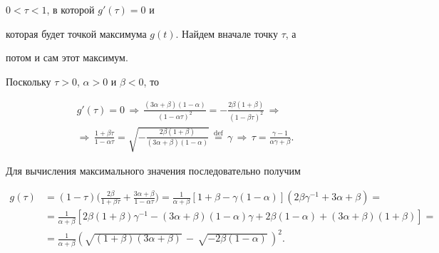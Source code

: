 $0<\tau<1$, в которой $g'(\tau)=0$ и


которая будет точкой максимума $g(t)$. Найдем вначале точку $\tau$, а


потом и сам этот максимум.





Поскольку $\tau>0$, $\alpha>0$ и $\beta<0$, то


\begin{multline*}


g'(\tau)=0\,\Longrightarrow\,


\frac{(3\alpha+\beta)(1-\alpha)}{(1-\alpha\tau)^2}=-


\frac{2\beta(1+\beta)}{(1-\beta\tau)^2}\,\Longrightarrow \\


%


\Longrightarrow\, \frac{1+\beta\tau}{1-\alpha\tau}=


\sqrt{-\frac{2\beta(1+\beta)}{(3\alpha+\beta)(1-\alpha)}}\,


\overset{\text{def}}{=}{}\,\gamma\,\Longrightarrow\,


\tau=\frac{\gamma-1}{\alpha\gamma+\beta}.


\end{multline*}


Для вычисления максимального значения последовательно получим


\begin{align*}


g(\tau)&=(1-\tau)


\biggl(\frac{2\beta}{1+\beta\tau}+


\frac{3\alpha+\beta}{1-\alpha\tau}\biggr)=


\frac{1}{\alpha+\beta}[1+\beta-\gamma(1-\alpha)]


(2\beta\gamma^{-1}+3\alpha+\beta)= \\


%


&=\frac{1}{\alpha+\beta}[2\beta(1+\beta)\gamma^{-1}-


(3\alpha+\beta)(1-\alpha)\gamma+2\beta(1-\alpha)


+(3\alpha+\beta)(1+\beta)]= \\


%


&=\frac{1}{\alpha+\beta}(\sqrt{(1+\beta)(3\alpha+\beta)}\,-\,


\sqrt{-2\beta(1-\alpha)}\,)^2.


\end{align*}






